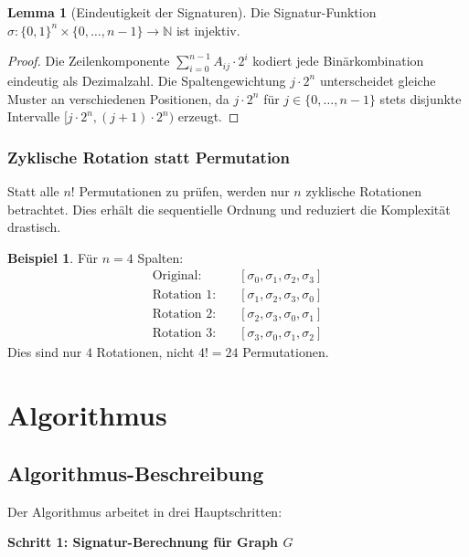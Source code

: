 ﻿\documentclass[a4paper,12pt]{article}
\theoremstyle{definition}
\newtheorem{beispiel}{Beispiel}
\newtheorem{lemma}{Lemma}
\begin{document}
\begin{lemma}[Eindeutigkeit der Signaturen]
	Die Signatur-Funktion $\sigma: \{0,1\}^n \times \{0,\ldots,n-1\} \to \mathbb{N}$ ist injektiv.
\end{lemma}

\begin{proof}
	Die Zeilenkomponente $\sum_{i=0}^{n-1} A_{ij} \cdot 2^i$ kodiert jede Binärkombination eindeutig als Dezimalzahl. Die Spaltengewichtung $j \cdot 2^n$ unterscheidet gleiche Muster an verschiedenen Positionen, da $j \cdot 2^n$ für $j \in \{0,\ldots,n-1\}$ stets disjunkte Intervalle $[j \cdot 2^n, (j+1) \cdot 2^n)$ erzeugt.
\end{proof}

\subsubsection{Zyklische Rotation statt Permutation}

Statt alle $n!$ Permutationen zu prüfen, werden nur $n$ zyklische Rotationen betrachtet. Dies erhält die sequentielle Ordnung und reduziert die Komplexität drastisch.

\begin{beispiel}
	Für $n=4$ Spalten:
	\begin{align*}
		\text{Original:} & \quad [\sigma_0, \sigma_1, \sigma_2, \sigma_3] \\
		\text{Rotation 1:} & \quad [\sigma_1, \sigma_2, \sigma_3, \sigma_0] \\
		\text{Rotation 2:} & \quad [\sigma_2, \sigma_3, \sigma_0, \sigma_1] \\
		\text{Rotation 3:} & \quad [\sigma_3, \sigma_0, \sigma_1, \sigma_2]
	\end{align*}
	Dies sind nur $4$ Rotationen, nicht $4! = 24$ Permutationen.
\end{beispiel}

\section{Algorithmus}

\subsection{Algorithmus-Beschreibung}

Der Algorithmus arbeitet in drei Hauptschritten:

\textbf{Schritt 1: Signatur-Berechnung für Graph $G$}
\end{document}

